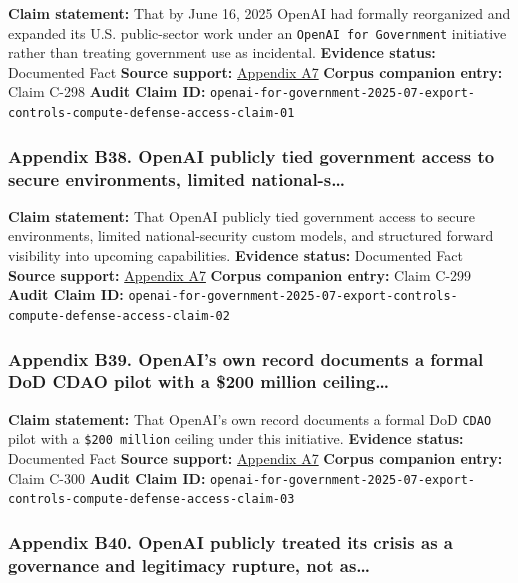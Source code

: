 \documentclass[
  american,
  11pt,
  letterpaper,
]{article}
\begin{document}
\textbf{Claim statement:} That by June 16, 2025 OpenAI had formally
reorganized and expanded its U.S. public-sector work under an
\texttt{OpenAI\ for\ Government} initiative rather than treating
government use as incidental. \textbf{Evidence status:} Documented Fact
\textbf{Source support:}
\hyperref[ch-08-appendix-a7-introducing-openai-for-government]{Appendix
A7} \textbf{Corpus companion entry:} Claim C-298 \textbf{Audit Claim
ID:}
\texttt{openai-for-government-2025-07-export-controls-compute-defense-access-claim-01}

\subsubsection{Appendix B38. OpenAI publicly tied government access to
secure environments, limited
national-s\ldots{}}\label{ch-08-appendix-b38-openai-publicly-tied-government-access-to-secure-environments-limited-national-s}

\textbf{Claim statement:} That OpenAI publicly tied government access to
secure environments, limited national-security custom models, and
structured forward visibility into upcoming capabilities.
\textbf{Evidence status:} Documented Fact \textbf{Source support:}
\hyperref[ch-08-appendix-a7-introducing-openai-for-government]{Appendix
A7} \textbf{Corpus companion entry:} Claim C-299 \textbf{Audit Claim
ID:}
\texttt{openai-for-government-2025-07-export-controls-compute-defense-access-claim-02}

\subsubsection{Appendix B39. OpenAI's own record documents a formal DoD
CDAO pilot with a \$200 million
ceiling\ldots{}}\label{ch-08-appendix-b39-openai-s-own-record-documents-a-formal-dod-cdao-pilot-with-a-200-million-ceiling}

\textbf{Claim statement:} That OpenAI's own record documents a formal
DoD \texttt{CDAO} pilot with a \texttt{\$200\ million} ceiling under
this initiative. \textbf{Evidence status:} Documented Fact
\textbf{Source support:}
\hyperref[ch-08-appendix-a7-introducing-openai-for-government]{Appendix
A7} \textbf{Corpus companion entry:} Claim C-300 \textbf{Audit Claim
ID:}
\texttt{openai-for-government-2025-07-export-controls-compute-defense-access-claim-03}

\subsubsection{Appendix B40. OpenAI publicly treated its crisis as a
governance and legitimacy rupture, not
as\ldots{}}\label{ch-08-appendix-b40-openai-publicly-treated-its-crisis-as-a-governance-and-legitimacy-rupture-not-as}
\end{document}
